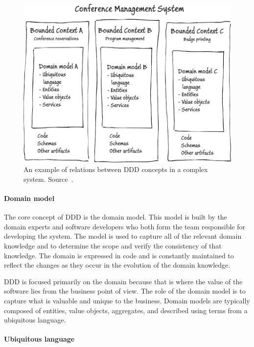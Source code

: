 \documentclass{book}
\begin{document}
\begin{figure}[h!]
\begin{center}
\includegraphics[width=1\columnwidth]{figures/ddd/ddd}
\caption[Relations between DDD concepts]{An example of relations between DDD concepts in a complex system. Source~\cite{journey}.%
}
\end{center}
\end{figure}

\paragraph{Domain model}\label{domain-model}

The core concept of DDD is the domain model. This model is built by the
domain experts and software developers who both form the team
responsible for developing the system. The model is used to capture all
of the relevant domain knowledge and to determine the scope and verify
the consistency of that knowledge. The domain is expressed in code and
is constantly maintained to reflect the changes as they occur in the
evolution of the domain knowledge.

DDD is focused primarily on the domain because that is where the value
of the software lies from the business point of view. The role of the
domain model is to capture what is valuable and unique to the business.
Domain models are typically composed of entities, value objects,
aggregates, and described using terms from a ubiquitous language.

\paragraph{Ubiquitous language}\label{ubiquitous-language}
\end{document}
